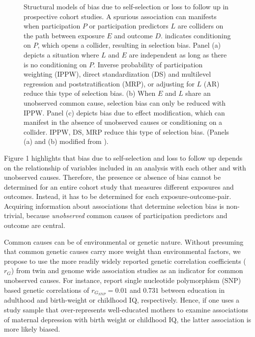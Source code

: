 \documentclass[12pt]{article}
\newcommand*\circled[1]{\tikz[baseline=(char.base)]{
		\node[shape=circle,draw,inner sep=2pt] (char) {#1};}}
\begin{document}
\begin{figure}
	\centering
	\caption{Structural models of bias due to self-selection or loss to follow up in prospective cohort studies. A spurious association can manifests when participation $P$ or participation predictors $L$ are colliders on the path between exposure $E$ and outcome $D$. \protect\circled{$P$} indicates conditioning on $P$, which opens a collider, resulting in selection bias. Panel (a) depicts a situation where $L$ and $E$ are independent as long as there is no conditioning on $P$. Inverse probability of participation weighting (IPPW), direct standardization (DS) and multilevel regression and poststratification (MRP), or adjusting for $L$ (AR) reduce this type of selection bias. (b) When $E$ and $L$ share an unobserved common cause, selection bias can only be reduced with IPPW. Panel (c) depicts bias due to effect modification, which can manifest in the absence of unobserved causes or conditioning on a collider. IPPW, DS, MRP reduce this type of selection bias. (Panels (a) and (b) modified from \cite{Hernan2004-oz}).}
	\label{fig:SelectionBias}
\end{figure}


Figure 1 highlights that bias due to self-selection and loss to follow up depends on the relationship of variables included in an analysis with each other and with unobserved causes. Therefore, the presence or absence of bias cannot be determined for an entire cohort study that measures different exposures and outcomes. Instead, it has to be determined for each exposure-outcome-pair. Acquiring information about associations that determine selection bias is non-trivial, because \emph{unobserved} common causes of participation predictors and outcome are central. 

Common causes can be of environmental \cite{Johnson2011-wi,Verweij2013-xk} or genetic nature. Without presuming  that common genetic causes carry more weight than environmental factors, we propose to use the more readily widely reported genetic correlation coefficients ($r_G$) from twin \cite{Tambs2012-km} and genome wide association studies \cite{Bulik-Sullivan2015-er} as an indicator for common unobserved causes. For instance, \citeauthor{Bulik-Sullivan2015-xn} \cite{Bulik-Sullivan2015-xn} report single nucleotide polymorphism (SNP) based genetic correlations of $r_{G_{SNP}}=0.01$ and $0.731$ between education in adulthood and birth-weight or childhood IQ, respectively. Hence, if one uses a study sample that over-represents well-educated mothers to examine associations of maternal depression with birth weight or childhood IQ, the latter association is more likely biased.
\end{document}

